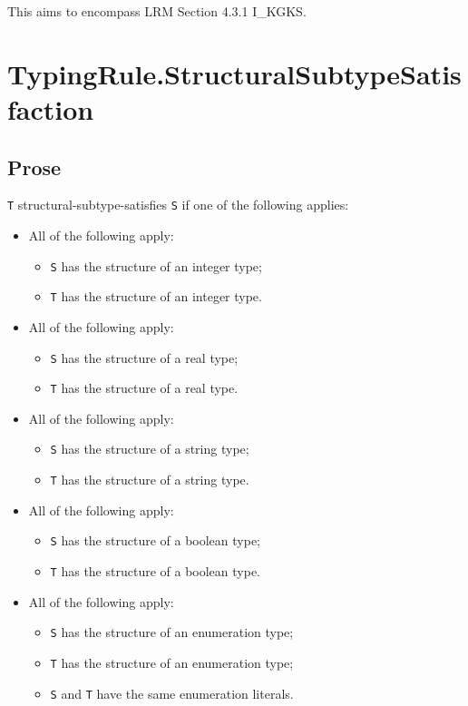 \documentclass{book}
\begin{document}
  This aims to encompass LRM Section 4.3.1 I\_KGKS.

\section{TypingRule.StructuralSubtypeSatisfaction}

\subsection{Prose}
  \texttt{T} structural-subtype-satisfies \texttt{S} if one of the following applies:
  \begin{itemize}
  \item All of the following apply:
    \begin{itemize}
    \item \texttt{S} has the structure of an integer type;
    \item \texttt{T} has the structure of an integer type.
    \end{itemize}

  \item All of the following apply:
    \begin{itemize}
    \item \texttt{S} has the structure of a real type;
    \item \texttt{T} has the structure of a real type.
    \end{itemize} 

  \item All of the following apply:
    \begin{itemize}
    \item \texttt{S} has the structure of a string type;
    \item \texttt{T} has the structure of a string type.
    \end{itemize}

  \item All of the following apply:
    \begin{itemize}
    \item \texttt{S} has the structure of a boolean type;
    \item \texttt{T} has the structure of a boolean type.
    \end{itemize}

  \item All of the following apply:
    \begin{itemize}
    \item \texttt{S} has the structure of an enumeration type; 
    \item \texttt{T} has the structure of an enumeration type;
    \item \texttt{S} and \texttt{T} have the same enumeration literals.
    \end{itemize}


\end{itemize}
\end{document}
